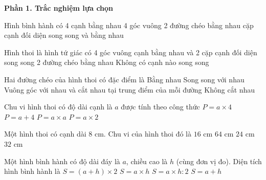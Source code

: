 \textbf{Phần 1. Trắc nghiệm lựa chọn}

\begin{ex} %
Hình bình hành có
\choice
{4 cạnh bằng nhau}
{4 góc vuông}
{2 đường chéo bằng nhau}
{ cặp cạnh đối diện song song và bằng nhau}
\end{ex}

\begin{ex} %
Hình thoi là hình tứ giác có
\choice
{4 góc vuông}
{ cạnh bằng nhau và 2 cặp cạnh đối diện song song}
{2 đường chéo bằng nhau}
{Không có cạnh nào song song}
\end{ex}

\begin{ex} %
Hai đường chéo của hình thoi có đặc điểm là
\choice
{Bằng nhau}
{Song song với nhau}
{\True Vuông góc với nhau và cắt nhau tại trung điểm của mỗi đường}
{Không cắt nhau}
\end{ex}

\begin{ex} %
Chu vi hình thoi có độ dài cạnh là $a$ được tính theo công thức
\choice
{\True $P = a \times 4$}
{$P = a + 4$}
{$P = a \times a$}
{$P = a \times 2$}
\end{ex}

\begin{ex} %
Một hình thoi có cạnh dài $8\text{ cm}$. Chu vi của hình thoi đó là
\choice
{$16\text{ cm}$}
{$64\text{ cm}$}
{$24\text{ cm}$}
{\True $32\text{ cm}$}
\end{ex}

\begin{ex} %
Một hình bình hành có độ dài đáy là $a$, chiều cao là $h$ (cùng đơn vị đo). Diện tích hình bình hành là
\choice
{$S = (a + h) \times 2$}
{\True $S = a \times h$}
{$S = a \times h : 2$}
{$S = a + h$}
\end{ex}

